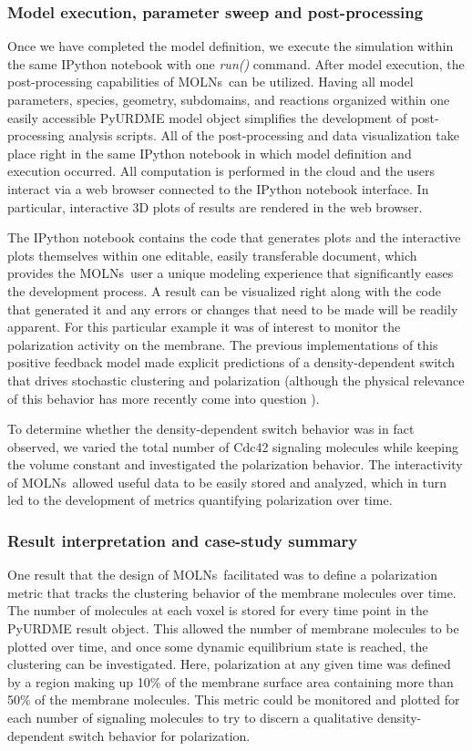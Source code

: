 \documentclass[final,leqno,onefignum,onetabnum]{siamltex1213}
\def\packagename {MOLNs}
\begin{document}
\subsubsection{Model execution, parameter sweep and post-processing}
Once we have completed the model definition, we execute the simulation within the same IPython notebook with one \emph{run()} command. After model execution, the post-processing capabilities of \packagename~can be utilized. Having all model parameters, species, geometry, subdomains, and reactions organized within one easily accessible PyURDME model object simplifies the development of  post-processing analysis scripts. All of the post-processing and data visualization take place right in the same IPython notebook in which model definition and execution occurred. All computation is performed in the cloud and the users interact via a web browser connected to the IPython notebook interface. In particular, interactive 3D plots of results are rendered in the web browser.

The IPython notebook contains the code that generates plots and the interactive plots themselves within one editable, easily transferable document, which provides the \packagename~user a unique modeling experience that significantly eases the development process. A result can be visualized right along with the code that generated it and any errors or changes that need to be made will be readily apparent. For this particular example it was of interest to monitor the polarization activity on the membrane. The previous implementations of this positive feedback model \cite{Altschuler2011} made explicit predictions of a density-dependent switch that drives stochastic clustering and polarization (although the physical relevance of this behavior has more recently come into question  \cite{Frei1}). 

To determine whether the density-dependent switch behavior was in fact observed, we varied the total number of Cdc42 signaling molecules while keeping the volume constant and investigated the polarization behavior. The interactivity of \packagename~allowed useful data to be easily stored and analyzed, which in turn led to the development of metrics quantifying polarization over time.

\subsubsection{Result interpretation and case-study summary}
One result that the design of \packagename~facilitated was to define a polarization metric that tracks the clustering behavior of the membrane molecules over time. The number of molecules at each voxel is stored for every time point in the PyURDME result object. This allowed the number of membrane molecules to be plotted over time, and once some dynamic equilibrium state is reached, the clustering can be investigated. Here, polarization at any given time was defined by a region making up 10\% of the membrane surface area containing more than 50\% of the membrane molecules.
This metric could be monitored and plotted for each number of signaling molecules to try to discern a qualitative density-dependent switch behavior for polarization. 
\end{document}
